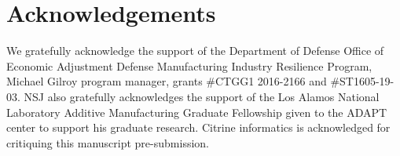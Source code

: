





\section*{Acknowledgements}
We gratefully acknowledge the support of the Department of Defense Office of Economic Adjustment Defense Manufacturing Industry Resilience Program, Michael Gilroy program manager, grants \#CTGG1 2016-2166 and \#ST1605-19-03. NSJ also gratefully acknowledges the support of the Los Alamos National Laboratory Additive Manufacturing Graduate Fellowship given to the ADAPT center to support his graduate research. Citrine informatics is acknowledged for critiquing this manuscript pre-submission.





